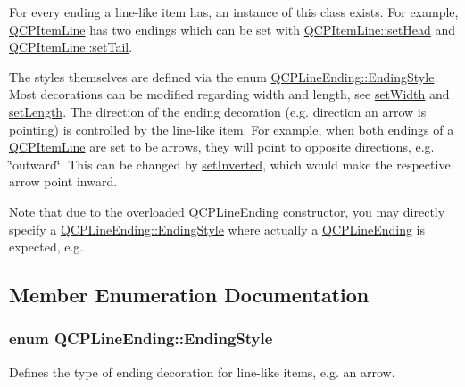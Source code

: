  For every ending a line-\/like item has, an instance of this class exists. For example, \hyperlink{classQCPItemLine}{Q\+C\+P\+Item\+Line} has two endings which can be set with \hyperlink{classQCPItemLine_aebf3d687114d584e0459db6759e2c3c3}{Q\+C\+P\+Item\+Line\+::set\+Head} and \hyperlink{classQCPItemLine_ac264222c3297a7efe33df9345c811a5f}{Q\+C\+P\+Item\+Line\+::set\+Tail}.

The styles themselves are defined via the enum \hyperlink{classQCPLineEnding_a5ef16e6876b4b74959c7261d8d4c2cd5}{Q\+C\+P\+Line\+Ending\+::\+Ending\+Style}. Most decorations can be modified regarding width and length, see \hyperlink{classQCPLineEnding_a26dc020ea985a72cc25881ce2115e34e}{set\+Width} and \hyperlink{classQCPLineEnding_ae36fa01763751cd64b7f56c3507e935a}{set\+Length}. The direction of the ending decoration (e.\+g. direction an arrow is pointing) is controlled by the line-\/like item. For example, when both endings of a \hyperlink{classQCPItemLine}{Q\+C\+P\+Item\+Line} are set to be arrows, they will point to opposite directions, e.\+g. \char`\"{}outward\char`\"{}. This can be changed by \hyperlink{classQCPLineEnding_a580e4e2360b35ebb8d68f3494aa2335d}{set\+Inverted}, which would make the respective arrow point inward.

Note that due to the overloaded \hyperlink{classQCPLineEnding}{Q\+C\+P\+Line\+Ending} constructor, you may directly specify a \hyperlink{classQCPLineEnding_a5ef16e6876b4b74959c7261d8d4c2cd5}{Q\+C\+P\+Line\+Ending\+::\+Ending\+Style} where actually a \hyperlink{classQCPLineEnding}{Q\+C\+P\+Line\+Ending} is expected, e.\+g. 
\begin{DoxyCodeInclude}
\end{DoxyCodeInclude}


\subsection{Member Enumeration Documentation}
\subsubsection[{\texorpdfstring{Ending\+Style}{EndingStyle}}]{\setlength{\rightskip}{0pt plus 5cm}enum {\bf Q\+C\+P\+Line\+Ending\+::\+Ending\+Style}}\hypertarget{classQCPLineEnding_a5ef16e6876b4b74959c7261d8d4c2cd5}{}\label{classQCPLineEnding_a5ef16e6876b4b74959c7261d8d4c2cd5}
Defines the type of ending decoration for line-\/like items, e.\+g. an arrow.



